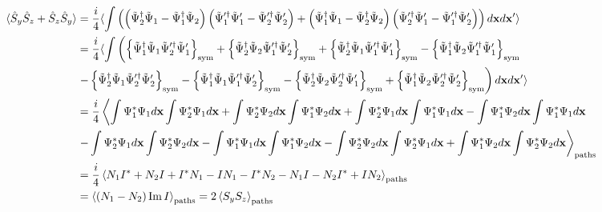\begin{equation*}
\begin{split}
	\langle \hat{S}_y \hat{S}_z + \hat{S}_z \hat{S}_y \rangle
	& = \frac{i}{4} \langle \int \left(
		\left(
			\tilde{\Psi}^\dagger_2 \tilde{\Psi}_1 - \tilde{\Psi}^\dagger_1 \tilde{\Psi}_2
		\right)
		\left(
			\tilde{\Psi}^{\prime\dagger}_1 \tilde{\Psi}^\prime_1 - \tilde{\Psi}^{\prime\dagger}_2 \tilde{\Psi}^\prime_2
		\right)
		+ \left(
			\tilde{\Psi}^\dagger_1 \tilde{\Psi}_1 - \tilde{\Psi}^\dagger_2 \tilde{\Psi}_2
		\right)
		\left(
			\tilde{\Psi}^{\prime\dagger}_2 \tilde{\Psi}^\prime_1 - \tilde{\Psi}^{\prime\dagger}_1 \tilde{\Psi}^\prime_2
		\right)
	\right) d\mathbf{x} d\mathbf{x}^\prime \rangle \\
	& = \frac{i}{4} \langle \int \left(
		\left\{  \tilde{\Psi}^\dagger_1 \tilde{\Psi}_1 \tilde{\Psi}^{\prime\dagger}_2 \tilde{\Psi}^\prime_1  \right\}_{\mathrm{sym}}
		+ \left\{  \tilde{\Psi}^\dagger_2 \tilde{\Psi}_2 \tilde{\Psi}^{\prime\dagger}_1 \tilde{\Psi}^\prime_2  \right\}_{\mathrm{sym}}
		+ \left\{  \tilde{\Psi}^\dagger_2 \tilde{\Psi}_1 \tilde{\Psi}^{\prime\dagger}_1 \tilde{\Psi}^\prime_1  \right\}_{\mathrm{sym}}
		- \left\{  \tilde{\Psi}^\dagger_1 \tilde{\Psi}_2 \tilde{\Psi}^{\prime\dagger}_1 \tilde{\Psi}^\prime_1  \right\}_{\mathrm{sym}}
	\right. \\
	& \left.
		- \left\{  \tilde{\Psi}^\dagger_2 \tilde{\Psi}_1 \tilde{\Psi}^{\prime\dagger}_2 \tilde{\Psi}^\prime_2  \right\}_{\mathrm{sym}}
		- \left\{  \tilde{\Psi}^\dagger_1 \tilde{\Psi}_1 \tilde{\Psi}^{\prime\dagger}_1 \tilde{\Psi}^\prime_2  \right\}_{\mathrm{sym}}
		- \left\{  \tilde{\Psi}^\dagger_2 \tilde{\Psi}_2 \tilde{\Psi}^{\prime\dagger}_2 \tilde{\Psi}^\prime_1  \right\}_{\mathrm{sym}}
		+ \left\{  \tilde{\Psi}^\dagger_1 \tilde{\Psi}_2 \tilde{\Psi}^{\prime\dagger}_2 \tilde{\Psi}^\prime_2  \right\}_{\mathrm{sym}}
	\right) d\mathbf{x} d\mathbf{x}^\prime \rangle \\
	& = \frac{i}{4} \left\langle
		\int \Psi^*_1 \Psi_1 d\mathbf{x} \int \Psi^*_2 \Psi_1 d\mathbf{x}
		+ \int \Psi^*_2 \Psi_2 d\mathbf{x} \int \Psi^*_1 \Psi_2 d\mathbf{x}
		+ \int \Psi^*_2 \Psi_1 d\mathbf{x} \int \Psi^*_1 \Psi_1 d\mathbf{x}
		- \int \Psi^*_1 \Psi_2 d\mathbf{x} \int \Psi^*_1 \Psi_1 d\mathbf{x} \right. \\
	&	\left. - \int \Psi^*_2 \Psi_1 d\mathbf{x} \int \Psi^*_2 \Psi_2 d\mathbf{x}
		- \int \Psi^*_1 \Psi_1 d\mathbf{x} \int \Psi^*_1 \Psi_2 d\mathbf{x}
		- \int \Psi^*_2 \Psi_2 d\mathbf{x} \int \Psi^*_2 \Psi_1 d\mathbf{x}
		+ \int \Psi^*_1 \Psi_2 d\mathbf{x} \int \Psi^*_2 \Psi_2 d\mathbf{x}
	\right\rangle_{\mathrm{paths}} \\
	& = \frac{i}{4} \left\langle 
		N_1 I^*
		+ N_2 I
		+ I^* N_1
		- I N_1
		- I^* N_2
		- N_1 I
		- N_2 I^*
		+ I N_2
	 \right\rangle_{\mathrm{paths}} \\
	& = \left\langle  (N_1 - N_2) \operatorname{Im} I  \right\rangle_{\mathrm{paths}} = 2 \left\langle  S_y S_z  \right\rangle_{\mathrm{paths}}
\end{split}
\end{equation*}

